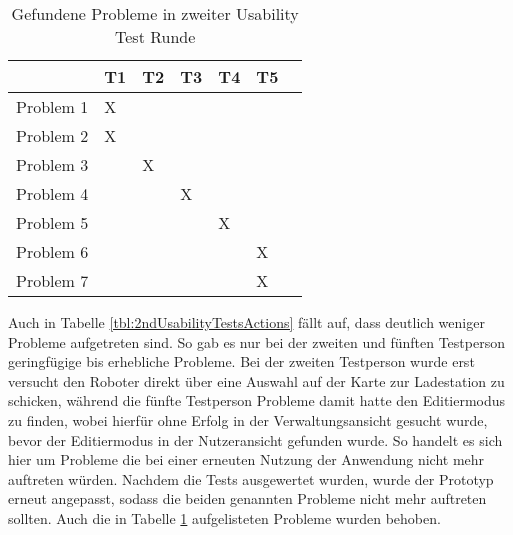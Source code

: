 \begin{table}[H]
    \caption{Gefundene Probleme in zweiter Usability Test Runde}\label{tbl:2ndUsabilityTestsProblems}
    \begin{tabular}{l||l|l|l|l|l|l}
                    & T1    & T2    & T3    & T4    & T5    \\ \hline
        Problem 1   & X     &       &       &       &       \\
        Problem 2   & X     &       &       &       &       \\
        Problem 3   &       & X     &       &       &       \\
        Problem 4   &       &       & X     &       &       \\
        Problem 5   &       &       &       & X     &       \\
        Problem 6   &       &       &       &       & X     \\
        Problem 7   &       &       &       &       & X     \\
    \end{tabular}    
\end{table}

Auch in Tabelle \ref{tbl:2ndUsabilityTestsActions} fällt auf, dass deutlich weniger Probleme aufgetreten sind. So gab es nur bei der zweiten und fünften Testperson geringfügige bis erhebliche Probleme. Bei der zweiten Testperson wurde erst versucht den Roboter direkt über eine Auswahl auf der Karte zur Ladestation zu schicken, während die fünfte Testperson Probleme damit hatte den Editiermodus zu finden, wobei hierfür ohne Erfolg in der Verwaltungsansicht gesucht wurde, bevor der Editiermodus in der Nutzeransicht gefunden wurde. So handelt es sich hier um Probleme die bei einer erneuten Nutzung der Anwendung nicht mehr auftreten würden. Nachdem die Tests ausgewertet wurden, wurde der Prototyp erneut angepasst, sodass die beiden genannten Probleme nicht mehr auftreten sollten. Auch die in Tabelle \ref{tbl:2ndUsabilityTestsProblems} aufgelisteten Probleme wurden behoben.

